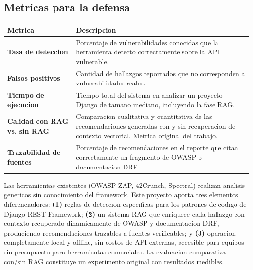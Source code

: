 \documentclass[12pt, a4paper]{article}
\begin{document}
\subsection{Metricas para la defensa}

\begin{center}
\begin{tabularx}{\linewidth}{>{\bfseries}lL}
\toprule
\textbf{Metrica} & \textbf{Descripcion} \\
\midrule
Tasa de deteccion &
Porcentaje de vulnerabilidades conocidas que la herramienta detecto correctamente sobre la API vulnerable. \\[4pt]
Falsos positivos &
Cantidad de hallazgos reportados que no corresponden a vulnerabilidades reales. \\[4pt]
Tiempo de ejecucion &
Tiempo total del sistema en analizar un proyecto Django de tamano mediano, incluyendo la fase RAG. \\[4pt]
Calidad con RAG vs. sin RAG &
Comparacion cualitativa y cuantitativa de las recomendaciones generadas con y sin recuperacion de contexto vectorial. Metrica original del trabajo. \\[4pt]
Trazabilidad de fuentes &
Porcentaje de recomendaciones en el reporte que citan correctamente un fragmento de OWASP o documentacion DRF. \\
\bottomrule
\end{tabularx}
\end{center}

\vspace{0.6cm}

\begin{infobox}[title={Argumento de originalidad para la defensa}]
Las herramientas existentes (OWASP ZAP, 42Crunch, Spectral) realizan analisis genericos sin conocimiento del framework. Este proyecto aporta tres elementos diferenciadores: \textbf{(1)} reglas de deteccion especificas para los patrones de codigo de Django REST Framework; \textbf{(2)} un sistema RAG que enriquece cada hallazgo con contexto recuperado dinamicamente de OWASP y documentacion DRF, produciendo recomendaciones trazables a fuentes verificables; y \textbf{(3)} operacion completamente local y offline, sin costos de API externas, accesible para equipos sin presupuesto para herramientas comerciales. La evaluacion comparativa con/sin RAG constituye un experimento original con resultados medibles.
\end{infobox}
\end{document}
